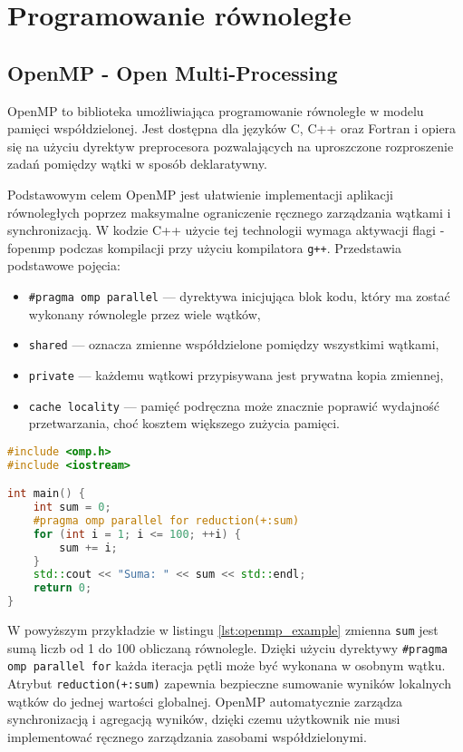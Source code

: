 \section{Programowanie równoległe}
\subsection{OpenMP -  Open Multi-Processing}
OpenMP to biblioteka umożliwiająca programowanie równoległe w modelu pamięci współdzielonej. Jest dostępna dla języków C, C++ oraz Fortran i opiera się na użyciu dyrektyw preprocesora pozwalających na uproszczone rozproszenie zadań pomiędzy wątki w sposób deklaratywny.

Podstawowym celem OpenMP jest ułatwienie implementacji aplikacji równoległych poprzez maksymalne ograniczenie ręcznego zarządzania wątkami i synchronizacją. W kodzie C++ użycie tej technologii wymaga aktywacji flagi -fopenmp podczas kompilacji przy użyciu kompilatora \texttt{g++}.
Przedstawia podstawowe pojęcia:
\begin{itemize}
    \item \texttt{\#pragma omp parallel} — dyrektywa inicjująca blok kodu, który ma zostać wykonany równolegle przez wiele wątków,
    \item \texttt{shared} — oznacza zmienne współdzielone pomiędzy wszystkimi wątkami,
    \item \texttt{private} — każdemu wątkowi przypisywana jest prywatna kopia zmiennej,
    \item \texttt{cache locality} — pamięć podręczna  może znacznie poprawić wydajność przetwarzania, choć kosztem większego zużycia pamięci.
\end{itemize}

\begin{lstlisting}[language=C++, caption={Przykład użycia OpenMP w C++}, label={lst:openmp_example}]
#include <omp.h>
#include <iostream>

int main() {
    int sum = 0;
    #pragma omp parallel for reduction(+:sum)
    for (int i = 1; i <= 100; ++i) {
        sum += i;
    }
    std::cout << "Suma: " << sum << std::endl;
    return 0;
}
\end{lstlisting}    
W powyższym przykładzie w listingu \ref{lst:openmp_example} zmienna \texttt{sum} jest sumą liczb od 1 do 100 obliczaną równolegle. Dzięki użyciu dyrektywy \texttt{\#pragma omp parallel for} każda iteracja pętli może być wykonana w osobnym wątku. Atrybut \texttt{reduction(+:sum)} zapewnia bezpieczne sumowanie wyników lokalnych wątków do jednej wartości globalnej. OpenMP automatycznie zarządza synchronizacją i agregacją wyników, dzięki czemu użytkownik nie musi implementować ręcznego zarządzania zasobami współdzielonymi.

